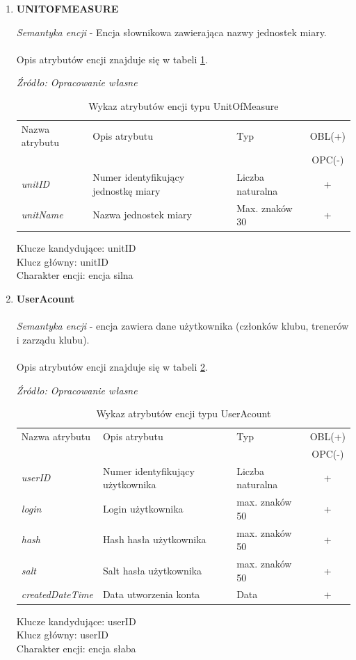 \documentclass[12pt,twoside]{report}
\begin{document}
\begin{enumerate}[start=10,label={\bfseries ENC$\backslash$\arabic*}]
\item \textbf{UNITOFMEASURE}

\textit{Semantyka encji} - Encja słownikowa zawierająca nazwy jednostek miary.
			\\ \\
Opis atrybutów encji znajduje się w tabeli \ref{UnitOfMeasure}.

\begin{table}[H]
	\caption{Wykaz atrybutów encji typu UnitOfMeasure }
	\textit{Źródło: Opracowanie własne}
	\label{UnitOfMeasure}
	\centering
	\begin{tabular}{|l|l|l|c|}
		\hline
		Nazwa atrybutu & Opis atrybutu & Typ & OBL(+) \\
		& & &  OPC(-) \\
		\hline
		\textit{unitID} & Numer identyfikujący jednostkę miary & Liczba naturalna & + \\
		\hline
		\textit{unitName} & Nazwa jednostek miary & Max. znaków 30 & + \\
		\hline
	\end{tabular}
\end{table}
Klucze kandydujące: unitID \\
Klucz główny: unitID \\
Charakter encji: encja silna \\

\item \textbf{UserAcount}\\ \\
\textit{Semantyka encji} - encja zawiera dane użytkownika (członków klubu, trenerów i zarządu klubu).
			\\ \\
Opis atrybutów encji znajduje się w tabeli \ref{UserAcountAtribute}.

\begin{table}[H]
	\caption{Wykaz atrybutów encji typu UserAcount }
	\textit{Źródło: Opracowanie własne}
	\label{UserAcountAtribute}
	\centering
	\begin{tabular}{|l|l|l|c|}
		\hline
		Nazwa atrybutu & Opis atrybutu & Typ & OBL(+) \\
		& & &  OPC(-) \\
		\hline
		\textit{userID} & Numer identyfikujący użytkownika & Liczba naturalna & + \\
		\hline
		\textit{login} & Login użytkownika & max. znaków 50 & + \\
		\hline
		\textit{hash} & Hash hasła użytkownika & max. znaków 50 & + \\
		\hline
		\textit{salt} & Salt hasła użytkownika & max. znaków 50 & + \\
		\hline
		\textit{createdDateTime} & Data utworzenia konta & Data & + \\
		\hline
	\end{tabular}
\end{table}
Klucze kandydujące: userID \\
Klucz główny: userID \\
Charakter encji: encja słaba \\


\end{enumerate}
\end{document}
